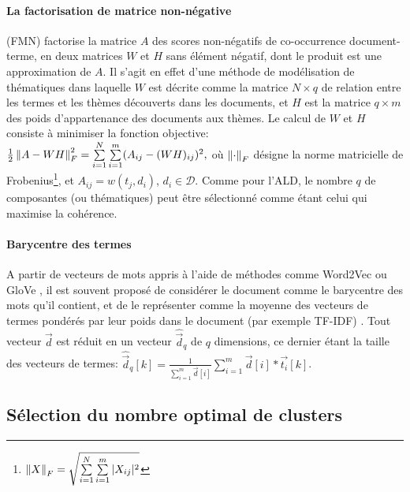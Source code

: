 \paragraph[NMF]{La factorisation de matrice non-négative} (FMN) \citep{paatero1994nmf} factorise la matrice $A$ des scores non-négatifs de co-occurrence document-terme, en deux matrices $W$ et $H$ sans élément négatif, dont le produit est une approximation de $A$. Il s'agit en effet d'une méthode de modélisation de thématiques dans laquelle $W$ est décrite comme la matrice $N\times q$ de relation entre les termes et les thèmes découverts dans les documents, et $H$ est la matrice $q\times m$ des poids d'appartenance des documents aux thèmes. Le calcul de $W$ et $H$ consiste à minimiser la fonction objective: $\frac{1}{2}\left\lVert A - WH\right\rVert^2_F = \sum\limits_{i=1}^N\sum\limits_{i=1}^m (A_{ij} - (WH)_{ij})^2,$ où $\left\lVert\cdot\right\rVert_F$ désigne la norme matricielle de Frobenius\footnote{$\left\lVert X\right\rVert_F = \sqrt{\sum\limits_{i=1}^N\sum\limits_{i=1}^m \vert X_{ij}\vert^2}$}, et $A_{ij} = w(t_j, d_i)$, $d_i \in \mathcal{D}$.  %
Comme pour l'ALD, le nombre $q$ de composantes (ou thématiques) peut être sélectionné comme étant celui qui  maximise la cohérence. 


\paragraph[w2v*TF-IDF]{Barycentre des termes}
A partir de vecteurs de mots appris à l'aide de méthodes comme Word2Vec \citep{mikolov2013word2vec} ou GloVe \citep{pennington2014glove}, il est souvent proposé de considérer le document comme le barycentre des mots qu'il contient, et de le représenter comme la moyenne des vecteurs de termes pondérés par leur poids dans le document (par exemple TF-IDF) \citep{lemikolov2014word2vec, charlet2018simbow_coria,arora2017wordAvgSentEmbedd}. Tout vecteur $\vec{d}$ est réduit en un vecteur $\hat{\vec{d}}_q$ de $q$ dimensions, ce dernier étant la taille des vecteurs de termes: $\hat{\vec{d}}_q[k] = \frac{1}{\sum\limits_{i=1}^m \vec{d}[i]} \sum\limits_{i=1}^{m}\vec{d}[i]*\vec{t_i}[k]$.

\subsection{Sélection du nombre optimal de clusters}
\label{sec:similarite:k-optimal}

